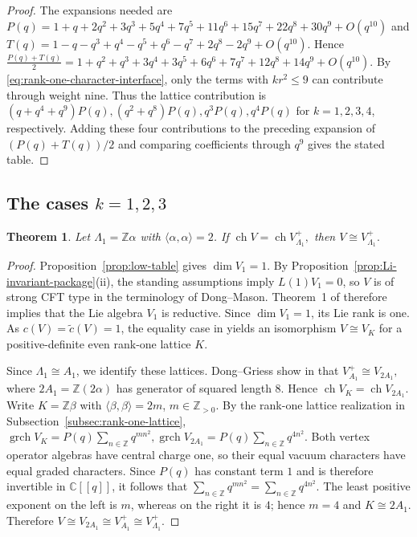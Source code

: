 \documentclass[12pt,leqno]{amsart}
\numberwithin{equation}{section} \newtheorem{thm}{Theorem}[section] \newtheorem{lem}[thm]{Lemma} \newtheorem{ex}[thm]{Example} \newtheorem{prop}[thm]{Proposition} \newtheorem{cor}[thm]{Corollary} \newtheorem{defi}[thm]{Definition} \newtheorem{rmk}[thm]{Remark} \newtheorem{notation}[thm]{Notation}
\newcommand{\ch}{\operatorname{ch}}
\newcommand{\grch}{\operatorname{grch}}
\def\Z{\mathbb{Z}} \def\N{\mathbb{N}} \def\A{\mathbb{A}} \def\C{\mathbb{C}} \def\R{\mathbb{R}} \def\Q{\mathbb{Q}} \def\F{\mathbb{F}}
\begin{document}
\begin{proof}
The expansions needed are \(P(q)=1+q+2q^2+3q^3+5q^4+7q^5+11q^6+15q^7+22q^8+30q^9+O(q^{10})\) and \(T(q)=1-q-q^3+q^4-q^5+q^6-q^7+2q^8-2q^9+O(q^{10}).\) Hence \(\frac{P(q)+T(q)}2 =1+q^2+q^3+3q^4+3q^5+6q^6+7q^7+12q^8+14q^9+O(q^{10}).\) By \eqref{eq:rank-one-character-interface}, only the terms with $kr^2\le9$ can contribute through weight nine. Thus the lattice contribution is \((q+q^4+q^9)P(q), (q^2+q^8)P(q), q^3P(q), q^4P(q)\) for $k=1,2,3,4$, respectively. Adding these four contributions to the preceding expansion of $(P(q)+T(q))/2$ and comparing coefficients through $q^9$ gives the stated table.
\end{proof}

\subsection{The cases \texorpdfstring{$k=1,2,3$}{k=1,2,3}}

\begin{thm}\label{thm:k1}
Let $\Lambda_1=\Z\alpha$ with $\langle\alpha,\alpha\rangle=2$. If \(\ch V=\ch V_{\Lambda_1}^+,\) then \(V\cong V_{\Lambda_1}^+.\)
\end{thm}

\begin{proof}
Proposition~\ref{prop:low-table} gives $\dim V_1=1$. By Proposition~\ref{prop:Li-invariant-package}(ii), the standing assumptions imply $L(1)V_1=0$, so $V$ is of strong CFT type in the terminology of Dong--Mason. Theorem~1 of \cite{DM} therefore implies that the Lie algebra $V_1$ is reductive. Since $\dim V_1=1$, its Lie rank is one. As $c(V)=\widetilde c(V)=1$, the equality case in \cite[Theorem~3]{DM} yields an isomorphism \(V\cong V_K\) for a positive-definite even rank-one lattice $K$.

Since $\Lambda_1\cong A_1$, we identify these lattices. Dong--Griess show in \cite[Section~3]{DG98} that \(V_{A_1}^+\cong V_{2A_1},\) where $2A_1=\Z(2\alpha)$ has generator of squared length $8$. Hence \(\ch V_K=\ch V_{2A_1}.\) Write $K=\Z\beta$ with $\langle\beta,\beta\rangle=2m$, $m\in\Z_{>0}$. By the rank-one lattice realization in Subsection~\ref{subsec:rank-one-lattice}, \(\grch V_K=P(q)\sum_{n\in\Z}q^{mn^2}, \grch V_{2A_1}=P(q)\sum_{n\in\Z}q^{4n^2}.\) Both vertex operator algebras have central charge one, so their equal vacuum characters have equal graded characters. Since $P(q)$ has constant term $1$ and is therefore invertible in $\C[[q]]$, it follows that \(\sum_{n\in\Z}q^{mn^2}=\sum_{n\in\Z}q^{4n^2}.\) The least positive exponent on the left is $m$, whereas on the right it is $4$; hence $m=4$ and $K\cong2A_1$. Therefore \(V\cong V_{2A_1}\cong V_{A_1}^+\cong V_{\Lambda_1}^+.\)
\end{proof}
\end{document}
